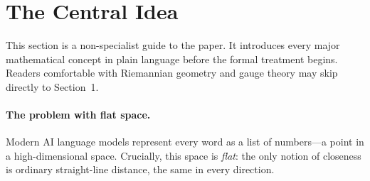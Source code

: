 \documentclass[11pt,a4paper]{article}
\theoremstyle{definition}
\theoremstyle{remark}
\begin{document}
\begin{abstract}
\textbf{Key insight (v7.1.1).} Temperature scaling 
(Phase~3) modulates logits via $\tau_{\mathrm{eff}}$, a 
\emph{monotone transformation}: it changes gradient magnitude but 
preserves gradient direction, so the proprioceptive signals cannot 
learn to steer computation---only to scale it. We introduce the 
\emph{Proprioceptive Gain Gate} (Phase~4):
\[
    h_t^{\mathrm{out}} = h_t \odot \bigl(\mathbf{1} + 
    W_g\,[\kappa_t,\,\mathrm{departure}_t]^\top\bigr),
\]
where $W_g \in \mathbb{R}^{d \times 2}$ is zero-initialized. This 
is a \emph{per-dimension} modulation: the gradient 
$\partial\mathcal{L}/\partial W_g = (\partial\mathcal{L}/
\partial h^{\mathrm{out}} \odot h_t)^\top\,[\kappa_t,\,
\mathrm{departure}_t]$ is directional, enabling cumulative learning. 
Unit tests confirm: temperature scaling achieves $0.01^\circ$ 
gradient angle change (cos = 0.9996); the gain gate achieves 
$27^\circ$ (cos = 0.89). Early training results on WikiText-103 
show \textbf{cumulative improvement}: 3\% advantage at step~500 
growing to 8.3\% at step~1900 relative to V6 baseline, with $W_g$ 
norm still climbing. The architecture contribution---geometric 
self-observation with per-dimension learned response---is the claim; 
additional proprioceptive channels ($\dot{\kappa}$, etc.) are v7.2.
\end{abstract}

\tableofcontents
\newpage


\section*{The Central Idea}
\label{sec:central-idea}

This section is a non-specialist guide to the paper. It introduces every major mathematical concept in plain language before the formal treatment begins. Readers comfortable with Riemannian geometry and gauge theory may skip directly to Section~1.

\paragraph{The problem with flat space.}
Modern AI language models represent every word as a list of numbers---a point in a high-dimensional space. Crucially, this space is \emph{flat}: the only notion of closeness is ordinary straight-line distance, the same in every direction.
\end{document}
